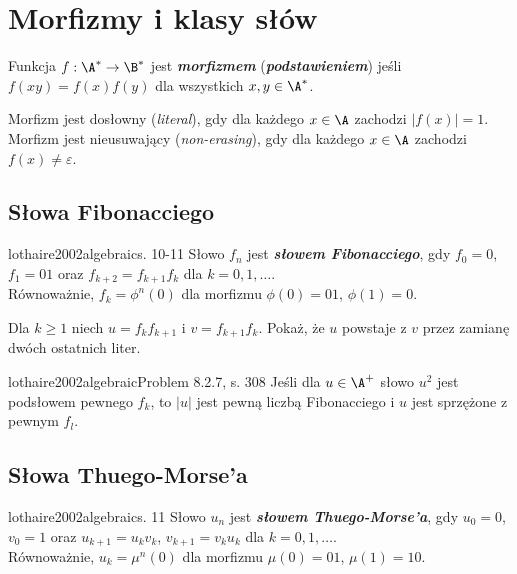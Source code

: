 \section{Morfizmy i klasy słów}

\begin{definition}{}{}
  Funkcja $f: \A^* \to \B^*$ jest \textbf{\textit{morfizmem}} (\textbf{\textit{podstawieniem}}) jeśli $f(xy) = f(x)f(y)$ dla wszystkich $x, y \in \A^*$.
\end{definition}
Morfizm jest dosłowny (\emph{literal}), gdy dla każdego $x \in \A$ zachodzi $|f(x)| = 1$. \\
Morfizm jest nieusuwający (\emph{non-erasing}), gdy dla każdego $x \in \A$ zachodzi $f(x) \neq \varepsilon$.

\subsection{Słowa Fibonacciego}

\begin{definition}{lothaire2002algebraic}{s. 10-11}
  Słowo $f_n$ jest \textbf{\textit{słowem Fibonacciego}}, gdy $f_0 = 0$, $f_1 = 01$ oraz $f_{k + 2} = f_{k + 1} f_k$ dla $k = 0, 1, \ldots$.
  \\
  Równoważnie, $f_k = \phi^n(0)$ dla morfizmu $\phi(0) = 01$, $\phi(1) = 0$.
\end{definition}

\begin{problem}{}{}
  Dla $k \ge 1$ niech $u = f_k f_{k + 1}$ i $v = f_{k + 1} f_k$. Pokaż, że $u$ powstaje z $v$ przez zamianę dwóch ostatnich liter.
\end{problem}

\begin{problem}{lothaire2002algebraic}{Problem 8.2.7, s. 308}
  Jeśli dla $u \in \A^+$ słowo $u^2$ jest podsłowem pewnego $f_k$, to $|u|$ jest pewną liczbą Fibonacciego i $u$ jest sprzężone z pewnym $f_l$.
\end{problem}

\subsection{Słowa Thuego-Morse'a}

\begin{definition}{lothaire2002algebraic}{s. 11}
  Słowo $u_n$ jest \textbf{\textit{słowem Thuego-Morse'a}}, gdy $u_0 = 0$, $v_0 = 1$ oraz $u_{k + 1} = u_k v_k$, $v_{k + 1} = v_k u_k$ dla $k = 0, 1, \ldots$.
  \\
  Równoważnie, $u_k = \mu^n(0)$ dla morfizmu $\mu(0) = 01$, $\mu(1) = 10$.
\end{definition}

